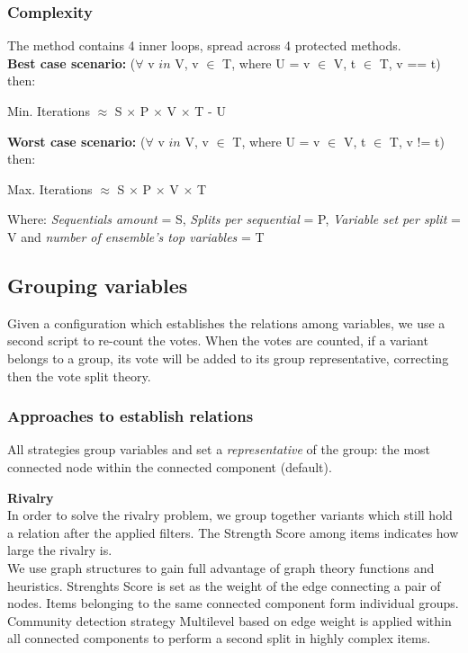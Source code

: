\subsubsection{Complexity}
The method contains 4 inner loops, spread across 4 protected methods.
\\

\textbf{Best case scenario:} ($\forall$ v $in$ V, v $\in$ T, where U = v $\in$ V, t $\in$ T, v == t) then:
\begin{center}
Min. Iterations $\approx$ S $\times$ P $\times$ V $\times$ T - U\\    
\end{center}

\textbf{Worst case scenario:} ($\forall$ v $in$ V, v $\in$ T, where U = v $\in$ V, t $\in$ T, v != t) then:
\begin{center}
Max. Iterations $\approx$ S $\times$ P $\times$ V $\times$ T\\    
\end{center}


Where: \textit{Sequentials amount} = S, \textit{Splits per sequential} = P, \textit{Variable set per split} = V and \textit{number of ensemble’s top variables} = T

\subsection{Grouping variables}
Given a configuration which establishes the relations among variables, we use a second script to re-count the votes. When the votes are counted, if a variant belongs to a group, its vote will be added to its group representative, correcting then the vote split theory. 

\subsubsection{Approaches to establish relations}
All strategies group variables and set a \textit{representative} of the group: the most connected node within the connected component (default).

\label{methods:grouping:approaches}
\textbf{Rivalry}\\
In order to solve the rivalry problem, we group together variants which still hold a relation after the applied filters. The Strength Score among items indicates how large the rivalry is. 
\\
We use graph structures to gain full advantage of graph theory functions and heuristics. Strenghts Score is set as the weight of the edge connecting a pair of nodes. 
Items belonging to the same connected component form individual groups. Community detection strategy Multilevel \cite{Blondel2008FastNetworks} based on edge weight is applied within all connected components to perform a second split in highly complex items.
\\

